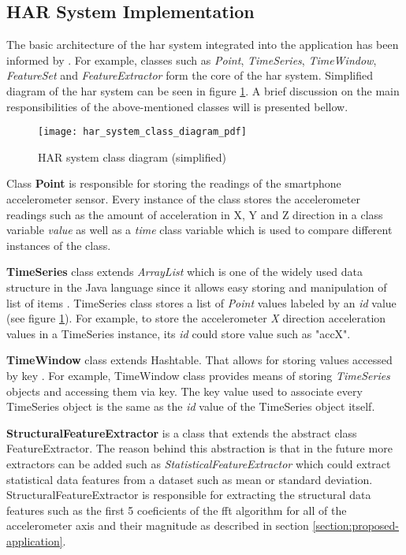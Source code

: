     \subsection{HAR System Implementation}
    The basic architecture of the \gls{har} system integrated into the application has been informed by \citet[149]{labrador2013}. For example, classes such as \textit{Point}, \textit{TimeSeries}, \textit{TimeWindow}, \textit{FeatureSet} and \textit{FeatureExtractor} form the core of the \gls{har} system. Simplified diagram of the \gls{har} system can be seen in figure \ref{fig:har_system_impl_class_diagram}. A brief discussion on the main responsibilities of the above-mentioned classes will is presented bellow.
    
    \begin{figure}[ht]
        \centering
        \texttt{[image: har\_system\_class\_diagram\_pdf]}
        \caption{HAR system class diagram (simplified)}
        \label{fig:har_system_impl_class_diagram}
    \end{figure}
    
    Class \textbf{Point} is responsible for storing the readings of the smartphone accelerometer sensor. Every instance of the class stores the accelerometer readings such as the amount of acceleration in X, Y and Z direction in a class variable \textit{value} as well as a \textit{time} class variable which is used to compare different instances of the class.
        
    \textbf{TimeSeries} class extends \textit{ArrayList} which is one of the widely used data structure in the Java language since it allows easy storing and manipulation of list of items \citep{oraclearrayList_2017}. TimeSeries class stores a list of \textit{Point} values labeled by an \textit{id} value (see figure \ref{fig:har_system_impl_class_diagram}). For example, to store the accelerometer \textit{X} direction acceleration values in a TimeSeries instance, its \textit{id} could store value such as "accX".
        
    \textbf{TimeWindow} class extends Hashtable. That allows for storing values accessed by key \citep{oraclehashtable_2017}. For example, TimeWindow class provides means of storing \textit{TimeSeries} objects and accessing them via key. The key value used to associate every TimeSeries object is the same as the \textit{id} value of the TimeSeries object itself.
    
    \textbf{StructuralFeatureExtractor} is a class that extends the abstract class FeatureExtractor. The reason behind this abstraction is that in the future more extractors can be added such as \textit{StatisticalFeatureExtractor} which could extract statistical data features from a dataset such as mean or standard deviation. StructuralFeatureExtractor is responsible for extracting the structural data features such as the first 5 coeficients of the \gls{fft} algorithm for all of the accelerometer axis and their magnitude as described in section \ref{section:proposed-application}.
    
